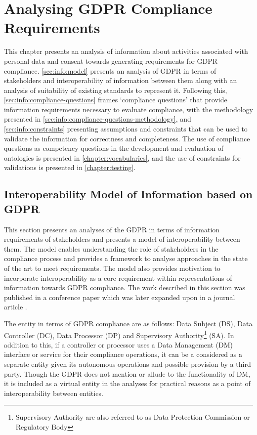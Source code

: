 \chapter{Analysing GDPR Compliance Requirements}
\label{chapter:information}

This chapter presents an analysis of information about activities associated with personal data and consent towards generating requirements for GDPR compliance. \autoref{sec:info:model} presents an analysis of GDPR in terms of stakeholders and interoperability of information between them along with an analysis of suitability of existing standards to represent it. Following this, \autoref{sec:info:compliance-questions} frames `compliance questions' that provide information requirements necessary to evaluate compliance, with the methodology presented in \autoref{sec:info:compliance-questions-methodology}, and \autoref{sec:info:constraints} presenting assumptions and constraints that can be used to validate the information for correctness and completeness.
The use of compliance questions as competency questions in the development and evaluation of ontologies is presented in \autoref{chapter:vocabularies}, and the use of constraints for validations is presented in \autoref{chapter:testing}.

\section{Interoperability Model of Information based on GDPR}\label{sec:info:model}

This section presents an analyses of the GDPR in terms of information requirements of stakeholders and presents a model of interoperability between them. The model enables understanding the role of stakeholders in the compliance process and provides a framework to analyse approaches in the state of the art to meet requirements. The model also provides motivation to incorporate interoperability as a core requirement within representations of information towards GDPR compliance.
The work described in this section was published in a conference paper
\cite{pandit_gdpr_2018} which was later expanded upon in a journal article \cite{pandit_exploration_2018}. %

The entity in terms of GDPR compliance are as follows: Data Subject (DS), Data Controller (DC), Data Processor (DP) and Supervisory Authority\footnote{Supervisory Authority are also referred to as Data Protection Commission or Regulatory Body} (SA). In addition to this, if a controller or processor uses a Data Management (DM) interface or service for their compliance operations, it can be a considered as a separate entity given its autonomous operations and possible provision by a third party. Though the GDPR does not mention or allude to the functionality of DM, it is included as a virtual entity in the analyses for practical reasons as a point of interoperability between entities.

